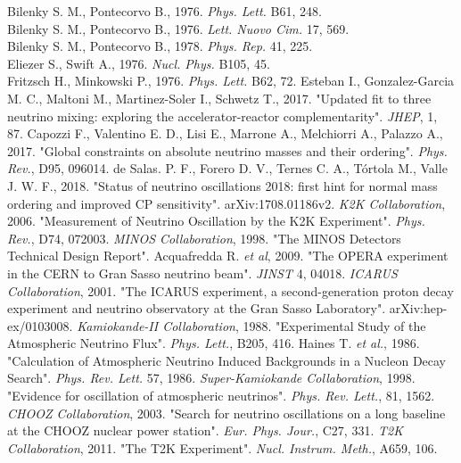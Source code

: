 \documentclass[english]{article}
\begin{document}
\begin{thebibliography}{99}
    Bilenky S. M., Pontecorvo B., 1976. \textit{Phys. Lett.} B61, 248.\\
    Bilenky S. M., Pontecorvo B., 1976. \textit{Lett. Nuovo Cim.} 17, 569.\\ 
    Bilenky S. M., Pontecorvo B., 1978. \textit{Phys. Rep.} 41, 225.\\
    Eliezer S., Swift A., 1976. \textit{Nucl. Phys.} B105, 45.\\
    Fritzsch H., Minkowski P., 1976. \textit{Phys. Lett.} B62, 72.
    Esteban I., Gonzalez-Garcia M. C., Maltoni M., Martinez-Soler I., Schwetz T., 2017. "Updated fit to three neutrino mixing: exploring the accelerator-reactor complementarity". \textit{JHEP}, 1, 87.
    Capozzi F., Valentino E. D., Lisi E., Marrone A., Melchiorri A., Palazzo A., 2017. "Global constraints on absolute neutrino masses and their ordering". \textit{Phys. Rev.}, D95, 096014.
    de Salas. P. F., Forero D. V., Ternes C. A., Tórtola M., Valle J. W. F., 2018. "Status of neutrino oscillations 2018: first hint for normal mass ordering and improved CP sensitivity". arXiv:1708.01186v2.
    \textit{K2K Collaboration}, 2006. "Measurement of Neutrino Oscillation by the K2K Experiment". \textit{Phys. Rev.}, D74, 072003.
    \textit{MINOS Collaboration}, 1998. "The MINOS Detectors Technical Design Report".
     Acquafredda R. \textit{et al}, 2009. "The OPERA experiment in the CERN to Gran Sasso neutrino beam". \textit{JINST} 4, 04018.
    \textit{ICARUS Collaboration}, 2001. "The ICARUS experiment, a second-generation proton decay experiment and neutrino observatory at the Gran Sasso Laboratory". arXiv:hep-ex/0103008.
    \textit{Kamiokande-II Collaboration}, 1988. "Experimental Study of the Atmospheric Neutrino Flux". \textit{Phys. Lett.}, B205, 416.
    Haines T. \textit{et al.}, 1986. "Calculation of Atmospheric Neutrino Induced Backgrounds in a Nucleon Decay Search". \textit{Phys. Rev. Lett.} 57, 1986.
    \textit{Super-Kamiokande Collaboration}, 1998. "Evidence for oscillation of atmospheric neutrinos". \textit{Phys. Rev. Lett.}, 81, 1562.
     \textit{CHOOZ Collaboration}, 2003. "Search for neutrino oscillations on a long baseline at the CHOOZ nuclear power station". \textit{Eur. Phys. Jour.}, C27, 331.
    \textit{T2K Collaboration}, 2011. "The T2K Experiment". \textit{Nucl. Instrum. Meth.}, A659, 106.

\end{thebibliography}
\end{document}
